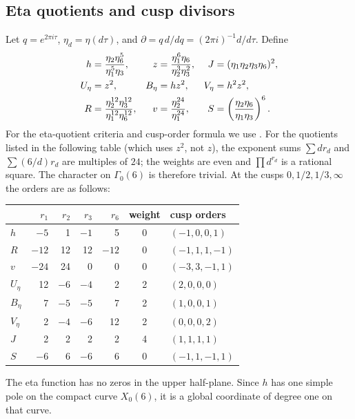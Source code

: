 \documentclass[11pt,a4paper]{article}
\theoremstyle{remark}
\newcommand{\dd}{\partial}
\newcommand{\Gbase}{\Gamma_0(6)}
\begin{document}
\subsection{Eta quotients and cusp divisors}
Let $q=e^{2\pi i\tau}$, $\eta_d=\eta(d\tau)$, and
$\dd=q\,d/dq=(2\pi i)^{-1}d/d\tau$. Define
\begin{align}\label{eq:eta-data}
 h&=\frac{\eta_2\eta_6^5}{\eta_1^5\eta_3},&
 z&=\frac{\eta_1^6\eta_6}{\eta_2^3\eta_3^2},&
 J&=(\eta_1\eta_2\eta_3\eta_6)^2,\\
 U_\eta&=z^2,& B_\eta&=hz^2,& V_\eta&=h^2z^2,\notag\\
 R&=\frac{\eta_2^{12}\eta_3^{12}}{\eta_1^{12}\eta_6^{12}},&
 v&=\frac{\eta_2^{24}}{\eta_1^{24}},&
 S&=\left(\frac{\eta_2\eta_6}{\eta_1\eta_3}\right)^6.\notag
\end{align}
For the eta-quotient criteria and cusp-order formula we use
\cite[p.~2]{rouse-webb}. For the quotients listed in the following table
(which uses $z^2$, not $z$), the exponent sums
$\sum dr_d$ and $\sum(6/d)r_d$ are multiples of $24$; the weights are
even and $\prod d^{r_d}$ is a rational square. The character on
$\Gbase$ is therefore trivial. At the cusps
$0,1/2,1/3,\infty$ the orders are as follows:
\begin{center}\small
\begin{tabular}{@{}lrrrrcl@{}}\toprule
 & $r_1$&$r_2$&$r_3$&$r_6$&weight&cusp orders\\\midrule
$h$&$-5$&1&$-1$&5&0&$(-1,0,0,1)$\\
$R$&$-12$&12&12&$-12$&0&$(-1,1,1,-1)$\\
$v$&$-24$&24&0&0&0&$(-3,3,-1,1)$\\
$U_\eta$&12&$-6$&$-4$&2&2&$(2,0,0,0)$\\
$B_\eta$&7&$-5$&$-5$&7&2&$(1,0,0,1)$\\
$V_\eta$&2&$-4$&$-6$&12&2&$(0,0,0,2)$\\
$J$&2&2&2&2&4&$(1,1,1,1)$\\
$S$&$-6$&6&$-6$&6&0&$(-1,1,-1,1)$\\\bottomrule
\end{tabular}
\end{center}
The eta function has no zeros in the upper half-plane. Since $h$ has
one simple pole on the compact curve $X_0(6)$, it is a global
coordinate of degree one on that curve.
\end{document}
